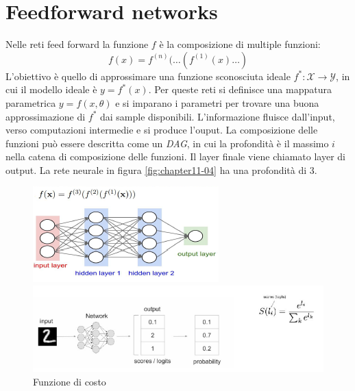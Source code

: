 \section{Feedforward networks}
Nelle reti feed forward la funzione $f$ \`e la composizione di multiple funzioni:
$$f(x) = f^{(n)}(\dots(f^{(1)}(x)\dots)$$
L'obiettivo \`e quello di approssimare una funzione sconosciuta ideale $f^*:\mathcal{X}\rightarrow\mathcal{Y}$, in cui il modello ideale \`e $y = f^*(x)$.
Per queste reti si definisce una mappatura parametrica $y = f(x,\theta)$ e si imparano i parametri per trovare una buona approssimazione di $f^*$ dai sample disponibili.
L'informazione fluisce dall'input, verso computazioni intermedie e si produce l'ouput.
La composizione delle funzioni pu\`o essere descritta come un \emph{DAG}, in cui la profondit\`a \`e il massimo $i$ nella catena di composizione delle funzioni.
Il layer finale viene chiamato layer di output. La rete neurale in figura \ref{fig:chapter11-04} ha una profondit\`a di 3.
\begin{figure}
	\centering
	\begin{minipage}{.5\textwidth}
		\centering
		\includegraphics[width=0.8\linewidth]{imgs/chapter11/img4}
		\caption{}
		\label{fig:chapter11-04}
	\end{minipage}%
	\begin{minipage}{.5\textwidth}
		\centering
		\includegraphics[width=1\linewidth]{imgs/chapter11/img5}
		\caption{Funzione di costo}
		\label{fig:chapter11-05}
	\end{minipage}
\end{figure}



